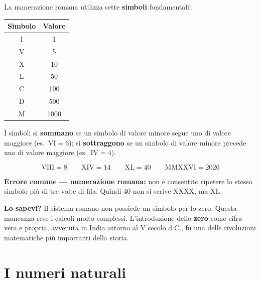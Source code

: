 \begin{regola}
  La numerazione romana utilizza sette \textbf{simboli} fondamentali:

  \medskip
  \begin{center}
    \begin{tabular}{cc}
      \toprule
      \textbf{Simbolo} & \textbf{Valore} \\
      \midrule
      I   &   1 \\
      V   &   5 \\
      X   &  10 \\
      L   &  50 \\
      C   & 100 \\
      D   & 500 \\
      M   & 1000 \\
      \bottomrule
    \end{tabular}
  \end{center}

  \medskip
  I simboli si \textbf{sommano} se un simbolo di valore minore segue uno di valore maggiore
  (es.\ $\mathrm{VI} = 6$);
  si \textbf{sottraggono} se un simbolo di valore minore precede uno di valore maggiore
  (es.\ $\mathrm{IV} = 4$).
\end{regola}

\begin{esempio}
  \[
    \mathrm{VIII} = 8 \qquad
    \mathrm{XIV} = 14 \qquad
    \mathrm{XL} = 40 \qquad
    \mathrm{MMXXVI} = 2026
  \]
\end{esempio}

\begin{attenzione}
  \textbf{Errore comune — numerazione romana:}
  non è consentito ripetere lo stesso simbolo più di tre volte di fila.
  Quindi $40$ non si scrive $\mathrm{XXXX}$, ma $\mathrm{XL}$.
\end{attenzione}

\begin{sapevi}
  \textbf{Lo sapevi?}
  Il sistema romano non possiede un simbolo per lo zero.
  Questa mancanza rese i calcoli molto complessi.
  L'introduzione dello \textbf{zero} come cifra vera e propria,
  avvenuta in India attorno al V secolo d.C.,
  fu una delle rivoluzioni matematiche più importanti della storia.
\end{sapevi}

\section{I numeri naturali}

